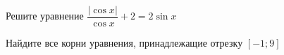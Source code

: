 \begin{ex}
	\begin{condition}
		\begin{enumcols}[label=\asbuk*)]
			\item Решите уравнение \( \dfrac{|\cos x|}{\cos x}+ 2 =2\sin x \)
			\item Найдите все корни уравнения, принадлежащие отрезку \( \left[-1;9\right] \)
		\end{enumcols}
	\end{condition}
\end{ex}